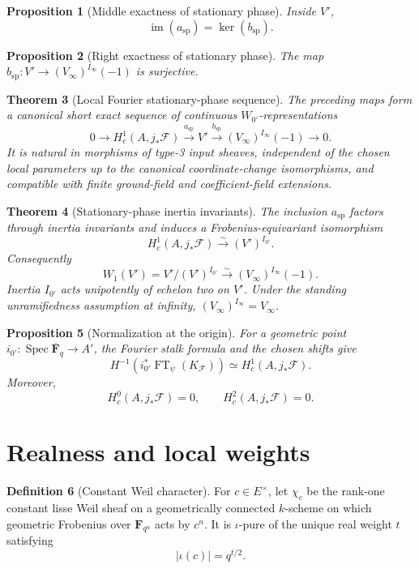 \documentclass[10pt]{article}
\newtheorem{theorem}{Theorem}[section]
\newtheorem{proposition}[theorem]{Proposition}
\theoremstyle{definition}
\newtheorem{definition}[theorem]{Definition}
\newcommand{\Fbar}{\overline{\mathbf F}_q}
\newcommand{\FT}{\operatorname{FT}}
\begin{document}
\begin{proposition}[Middle exactness of stationary phase]
Inside \(V'\),
\[
 \operatorname{im}(a_{\mathrm{sp}})=\ker(b_{\mathrm{sp}}).
\]
\end{proposition}

\begin{proposition}[Right exactness of stationary phase]
The map
\(b_{\mathrm{sp}}:V'\to(V_\infty)^{I_\infty}(-1)\) is surjective.
\end{proposition}

\begin{theorem}[Local Fourier stationary-phase sequence]
The preceding maps form a canonical short exact sequence of continuous
\(W_{0'}\)-representations
\[
 0\longrightarrow H_c^1(A,j_*\mathcal F)
 \xrightarrow{a_{\mathrm{sp}}}V'
 \xrightarrow{b_{\mathrm{sp}}}(V_\infty)^{I_\infty}(-1)
 \longrightarrow0.
\]
It is natural in morphisms of type-3 input sheaves, independent of the
chosen local parameters up to the canonical coordinate-change
isomorphisms, and compatible with finite ground-field and coefficient-field
extensions.
\end{theorem}

\begin{theorem}[Stationary-phase inertia invariants]
The inclusion \(a_{\mathrm{sp}}\) factors through inertia invariants and
induces a Frobenius-equivariant isomorphism
\[
 H_c^1(A,j_*\mathcal F)\xrightarrow{\sim}(V')^{I_{0'}}.
\]
Consequently
\[
 W_1(V')=V'/(V')^{I_{0'}}
 \xrightarrow{\sim}(V_\infty)^{I_\infty}(-1).
\]
Inertia \(I_{0'}\) acts unipotently of echelon two on \(V'\).  Under the
standing unramifiedness assumption at infinity,
\((V_\infty)^{I_\infty}=V_\infty\).
\end{theorem}

\begin{proposition}[Normalization at the origin]
For a geometric point \(i_{0'}:\operatorname{Spec}\Fbar\to A'\), the
Fourier stalk formula and the chosen shifts give
\[
 H^{-1}\!\left(i_{0'}^*\FT_\psi(K_{\mathcal F})\right)
       \simeq H_c^1(A,j_*\mathcal F).
\]
Moreover,
\[
 H_c^0(A,j_*\mathcal F)=0,\qquad H_c^2(A,j_*\mathcal F)=0.
\]
\end{proposition}

\section{Realness and local weights}

\begin{definition}[Constant Weil character]
For \(c\in E^\times\), let \(\chi_c\) be the rank-one constant lisse Weil
sheaf on a geometrically connected \(k\)-scheme on which geometric
Frobenius over \(\mathbf F_{q^n}\) acts by \(c^n\).  It is
\(\iota\)-pure of the unique real weight \(t\) satisfying
\[
                         |\iota(c)|=q^{t/2}.
\]
\end{definition}
\end{document}
